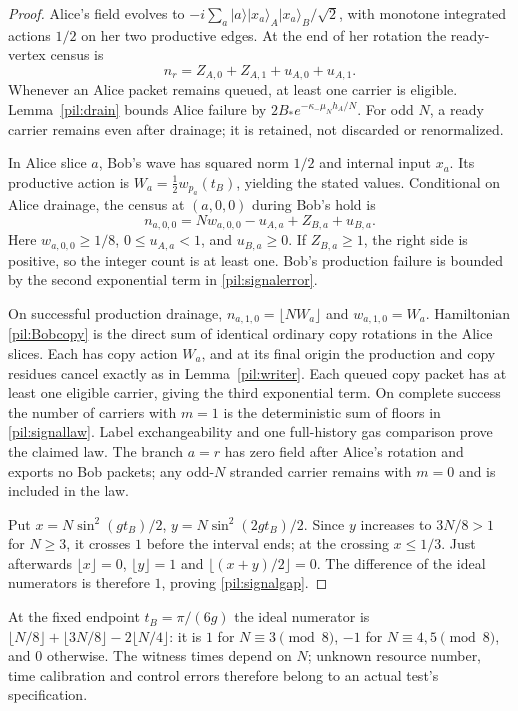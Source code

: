 \documentclass[11pt,a4paper]{article}
\theoremstyle{definition}
\theoremstyle{remark}\newtheorem{remark}[theorem]{Remark}
\begin{document}
\begin{proof}
Alice's field evolves to $-i\sum_a|a\rangle|x_a\rangle_A|x_a\rangle_B/\sqrt2$, with monotone integrated actions $1/2$ on her two productive edges. At the end of her rotation the ready-vertex census is
\[
 n_r=Z_{A,0}+Z_{A,1}+u_{A,0}+u_{A,1}.
\]
Whenever an Alice packet remains queued, at least one carrier is eligible. Lemma~\ref{pil:drain} bounds Alice failure by $2B_*e^{-\kappa_-\mu_Nh_A/N}$. For odd $N$, a ready carrier remains even after drainage; it is retained, not discarded or renormalized.

In Alice slice $a$, Bob's wave has squared norm $1/2$ and internal input $x_a$. Its productive action is $W_a=\tfrac12 w_{p_a}(t_B)$, yielding the stated values. Conditional on Alice drainage, the census at $(a,0,0)$ during Bob's hold is
\[
 n_{a,0,0}=Nw_{a,0,0}-u_{A,a}+Z_{B,a}+u_{B,a}.
\]
Here $w_{a,0,0}\ge1/8$, $0\le u_{A,a}<1$, and $u_{B,a}\ge0$. If $Z_{B,a}\ge1$, the right side is positive, so the integer count is at least one. Bob's production failure is bounded by the second exponential term in \eqref{pil:signalerror}.

On successful production drainage, $n_{a,1,0}=\lfloor NW_a\rfloor$ and $w_{a,1,0}=W_a$. Hamiltonian \eqref{pil:Bobcopy} is the direct sum of identical ordinary copy rotations in the Alice slices. Each has copy action $W_a$, and at its final origin the production and copy residues cancel exactly as in Lemma~\ref{pil:writer}. Each queued copy packet has at least one eligible carrier, giving the third exponential term. On complete success the number of carriers with $m=1$ is the deterministic sum of floors in \eqref{pil:signallaw}. Label exchangeability and one full-history gas comparison prove the claimed law. The branch $a=r$ has zero field after Alice's rotation and exports no Bob packets; any odd-$N$ stranded carrier remains with $m=0$ and is included in the law.

Put $x=N\sin^2(gt_B)/2$, $y=N\sin^2(2gt_B)/2$. Since $y$ increases to $3N/8>1$ for $N\ge3$, it crosses $1$ before the interval ends; at the crossing $x\le1/3$. Just afterwards $\lfloor x\rfloor=0$, $\lfloor y\rfloor=1$ and $\lfloor(x+y)/2\rfloor=0$. The difference of the ideal numerators is therefore $1$, proving \eqref{pil:signalgap}.
\end{proof}

At the fixed endpoint $t_B=\pi/(6g)$ the ideal numerator is
$\lfloor N/8\rfloor+\lfloor3N/8\rfloor-2\lfloor N/4\rfloor$: it is $1$ for $N\equiv3\pmod8$, $-1$ for $N\equiv4,5\pmod8$, and $0$ otherwise. The witness times depend on $N$; unknown resource number, time calibration and control errors therefore belong to an actual test's specification.
\end{document}
